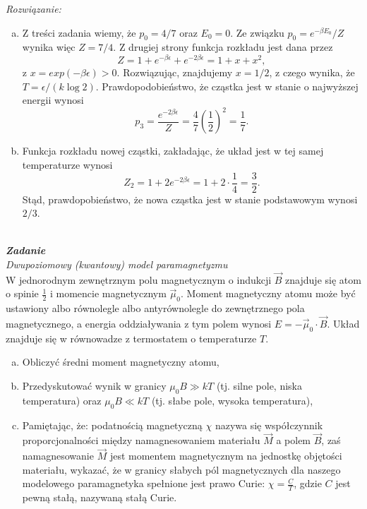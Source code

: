 \documentclass[11pt,a4paper]{article}
\newcounter{zadanie}\newcommand{\zadanie}[1][]{\addtocounter{zadanie}{1} ~\\  {\bf \emph{Zadanie \arabic{zadanie} #1 }} \\}
\begin{document}
{\em Rozwiązanie:}
\begin{enumerate}[a)]
\item Z treści zadania wiemy, że $p_0 = 4/7$ oraz $E_0 = 0$. Ze związku $p_0 = e^{-\beta E_0}/Z$ wynika więc $Z=7/4$. Z drugiej strony funkcja rozkładu jest dana przez
\begin{equation}
	Z = 1 + e^{-\beta \epsilon} + e^{-2 \beta \epsilon} = 1 + x + x^2,
\end{equation}  
z $x = exp(-\beta \epsilon) > 0$. Rozwiązując, znajdujemy $x = 1/2$, z czego wynika, że $T = \epsilon / (k \log 2)$. Prawdopodobieństwo, że cząstka jest w stanie o najwyższej energii wynosi
\begin{equation}
	p_3 = \frac{e^{-2 \beta \epsilon}}{Z} = \frac{4}{7} \left( \frac{1}{2}\right)^2 = \frac{1}{7}.
\end{equation}
\item Funkcja rozkładu nowej cząstki, zakładając, że układ jest w tej samej temperaturze wynosi
\begin{equation}
	Z_2 = 1 + 2 e^{-2\beta \epsilon} = 1 + 2 \cdot \frac{1}{4} = \frac{3}{2}.
\end{equation}
Stąd, prawdopobieństwo, że nowa cząstka jest w stanie podstawowym wynosi $2/3$. 
\end{enumerate}

\newpage

\zadanie
{\em Dwupoziomowy (kwantowy) model paramagnetyzmu}\\
W jednorodnym zewnętrznym polu magnetycznym o indukcji $\vec{B}$
znajduje się atom o spinie $\frac{1}{2}$ i momencie magnetycznym $\vec{\mu}_0$.
Moment magnetyczny atomu może być ustawiony albo równolegle albo antyrównolegle do
zewnętrznego pola magnetycznego, a energia oddziaływania z tym polem wynosi
$\displaystyle E = - \vec{\mu}_0 \cdot \vec{B}$.
Układ znajduje się w równowadze z termostatem o temperaturze $T$.
\begin{enumerate}[a)]
\item Obliczyć średni moment magnetyczny atomu,
\item Przedyskutować wynik w granicy $\mu_0 B \gg k T$ (tj. silne pole, niska temperatura) oraz $\mu_0 B \ll k T$ (tj. słabe pole, wysoka temperatura),
\item Pamiętając, że: podatnością magnetyczną $\chi$ nazywa się współczynnik proporcjonalności między namagnesowaniem materiału $\vec{M}$ a polem $\vec{B}$,
zaś namagnesowanie $\vec{M}$ jest momentem magnetycznym na jednostkę 
objętości materiału, wykazać, że w granicy słabych pól magnetycznych dla naszego modelowego paramagnetyka spełnione jest prawo Curie:
$\displaystyle \chi = \frac{C}{T}$,
gdzie $C$ jest pewną stałą, nazywaną stałą Curie.
\end{enumerate}
\end{document}
